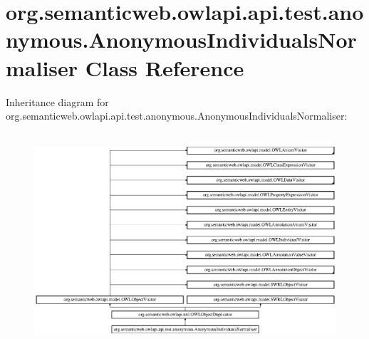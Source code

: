 \hypertarget{classorg_1_1semanticweb_1_1owlapi_1_1api_1_1test_1_1anonymous_1_1_anonymous_individuals_normaliser}{\section{org.\-semanticweb.\-owlapi.\-api.\-test.\-anonymous.\-Anonymous\-Individuals\-Normaliser Class Reference}
\label{classorg_1_1semanticweb_1_1owlapi_1_1api_1_1test_1_1anonymous_1_1_anonymous_individuals_normaliser}
}
Inheritance diagram for org.\-semanticweb.\-owlapi.\-api.\-test.\-anonymous.\-Anonymous\-Individuals\-Normaliser\-:\begin{figure}[H]
\begin{center}
\leavevmode
\includegraphics[height=7.947598cm]{classorg_1_1semanticweb_1_1owlapi_1_1api_1_1test_1_1anonymous_1_1_anonymous_individuals_normaliser}
\end{center}
\end{figure}
